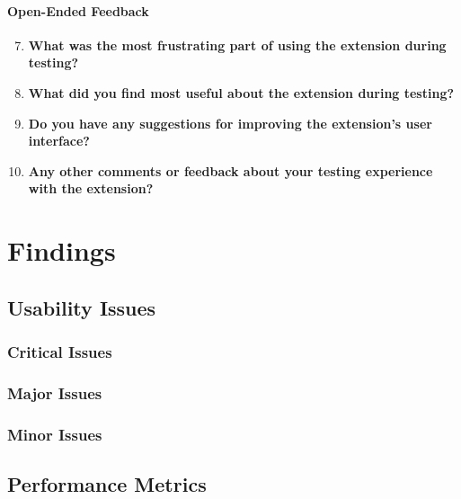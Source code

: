 \documentclass{article}
\begin{document}
\paragraph{Open-Ended Feedback}
\begin{enumerate}
    \setcounter{enumi}{6}
    \item \textbf{What was the most frustrating part of using the extension during testing?} \\
    \underline{\hspace{15cm}}
    
    \item \textbf{What did you find most useful about the extension during testing?} \\
    \underline{\hspace{15cm}}
    
    \item \textbf{Do you have any suggestions for improving the extension's user interface?} \\
    \underline{\hspace{15cm}}
    
    \item \textbf{Any other comments or feedback about your testing experience with the extension?} \\
    \underline{\hspace{15cm}}
\end{enumerate}


\newpage
\section{Findings}
\subsection{Usability Issues}
\subsubsection{Critical Issues}
\subsubsection{Major Issues}
\subsubsection{Minor Issues}

\subsection{Performance Metrics}
\end{document}
